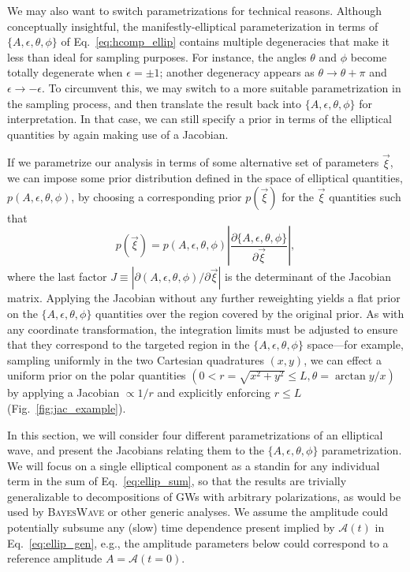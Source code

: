 \documentclass[aps,prd,twocolumn,superscriptaddress,preprintnumbers,floatfix,nofootinbib]{revtex4-2}
\newcommand*{\eq}[1]{Eq.~\eqref{eq:#1}}
\begin{document}
We may also want to switch parametrizations for technical reasons.
Although conceptually insightful, the manifestly-elliptical parameterization in terms of $\{A, \epsilon, \theta, \phi\}$ of \eq{hcomp_ellip} contains multiple degeneracies that make it less than ideal for sampling purposes.
For instance, the angles $\theta$ and $\phi$ become totally degenerate when $\epsilon = \pm 1$; another degeneracy appears as $\theta \to \theta + \pi$ and $\epsilon \to - \epsilon$.
To circumvent this, we may switch to a more suitable parametrization in the sampling process, and then translate the result back into $\{A, \epsilon, \theta, \phi\}$ for interpretation.
In that case, we can still specify a prior in terms of the elliptical quantities by again making use of a Jacobian.

If we parametrize our analysis in terms of some alternative set of parameters $\vec{\xi}$, we can impose some prior distribution defined in the space of elliptical quantities, $p({A, \epsilon, \theta, \phi})$, by choosing a corresponding prior $p(\vec{\xi})$ for the $\vec{\xi}$ quantities such that
\begin{equation} \label{eq:jac}
p \left( \vec{\xi} \right) = p \left( A, \epsilon, \theta, \phi \right) \left| \frac{\partial \{A, \epsilon, \theta, \phi\}}{\partial \vec{\xi}} \right| ,
\end{equation}
where the last factor $J \equiv | \partial (A, \epsilon, \theta, \phi)/\partial \vec{\xi} |$ is the determinant of the Jacobian matrix.
Applying the Jacobian without any further reweighting yields a flat prior on the  $\{A, \epsilon, \theta, \phi\}$ quantities over the region covered by the original prior.
As with any coordinate transformation, the integration limits must be adjusted to ensure that they correspond to the targeted region in the $\{A, \epsilon, \theta, \phi\}$ space---for example, sampling uniformly in the two Cartesian quadratures $(x, y)$, we can effect a uniform prior on the polar quantities $(0 < r=\sqrt{x^2+y^2} \leq L, \theta= \arctan y/x)$ by applying a Jacobian $\propto 1/r$ and explicitly enforcing $r \leq L$ (Fig.~\ref{fig:jac_example}).

In this section, we will consider four different parametrizations of an elliptical wave, and present the Jacobians relating them to the $\{A, \epsilon, \theta, \phi\}$ parametrization.
We will focus on a single elliptical component as a standin for any individual term in the sum of Eq.~\eqref{eq:ellip_sum}, so that the results are trivially generalizable to decompositions of GWs with arbitrary polarizations, as would be used by \textsc{BayesWave} or other generic analyses.
We assume the amplitude could potentially subsume any (slow) time dependence present implied by $\mathcal{A}(t)$ in Eq.~\eqref{eq:ellip_gen}, e.g., the amplitude parameters below could correspond to a reference amplitude $A=\mathcal{A}(t=0)$.
\end{document}

